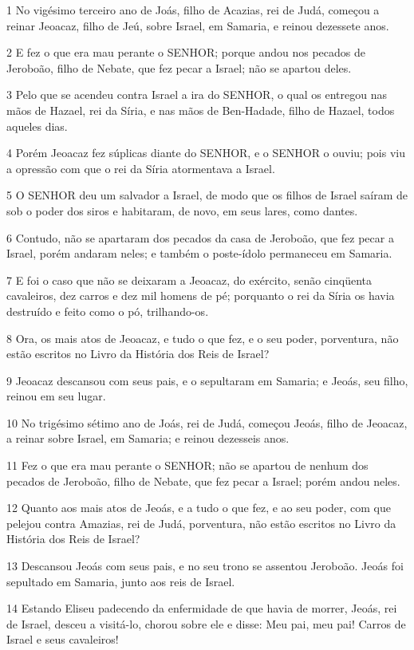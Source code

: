 \par 1 No vigésimo terceiro ano de Joás, filho de Acazias, rei de Judá, começou a reinar Jeoacaz, filho de Jeú, sobre Israel, em Samaria, e reinou dezessete anos.
\par 2 E fez o que era mau perante o SENHOR; porque andou nos pecados de Jeroboão, filho de Nebate, que fez pecar a Israel; não se apartou deles.
\par 3 Pelo que se acendeu contra Israel a ira do SENHOR, o qual os entregou nas mãos de Hazael, rei da Síria, e nas mãos de Ben-Hadade, filho de Hazael, todos aqueles dias.
\par 4 Porém Jeoacaz fez súplicas diante do SENHOR, e o SENHOR o ouviu; pois viu a opressão com que o rei da Síria atormentava a Israel.
\par 5 O SENHOR deu um salvador a Israel, de modo que os filhos de Israel saíram de sob o poder dos siros e habitaram, de novo, em seus lares, como dantes.
\par 6 Contudo, não se apartaram dos pecados da casa de Jeroboão, que fez pecar a Israel, porém andaram neles; e também o poste-ídolo permaneceu em Samaria.
\par 7 E foi o caso que não se deixaram a Jeoacaz, do exército, senão cinqüenta cavaleiros, dez carros e dez mil homens de pé; porquanto o rei da Síria os havia destruído e feito como o pó, trilhando-os.
\par 8 Ora, os mais atos de Jeoacaz, e tudo o que fez, e o seu poder, porventura, não estão escritos no Livro da História dos Reis de Israel?
\par 9 Jeoacaz descansou com seus pais, e o sepultaram em Samaria; e Jeoás, seu filho, reinou em seu lugar.
\par 10 No trigésimo sétimo ano de Joás, rei de Judá, começou Jeoás, filho de Jeoacaz, a reinar sobre Israel, em Samaria; e reinou dezesseis anos.
\par 11 Fez o que era mau perante o SENHOR; não se apartou de nenhum dos pecados de Jeroboão, filho de Nebate, que fez pecar a Israel; porém andou neles.
\par 12 Quanto aos mais atos de Jeoás, e a tudo o que fez, e ao seu poder, com que pelejou contra Amazias, rei de Judá, porventura, não estão escritos no Livro da História dos Reis de Israel?
\par 13 Descansou Jeoás com seus pais, e no seu trono se assentou Jeroboão. Jeoás foi sepultado em Samaria, junto aos reis de Israel.
\par 14 Estando Eliseu padecendo da enfermidade de que havia de morrer, Jeoás, rei de Israel, desceu a visitá-lo, chorou sobre ele e disse: Meu pai, meu pai! Carros de Israel e seus cavaleiros!
